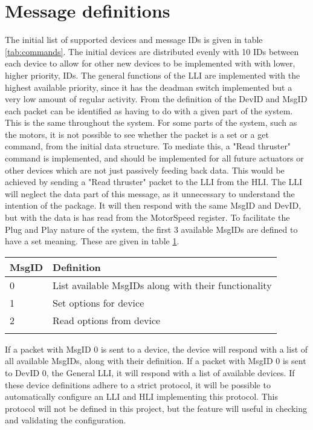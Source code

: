 \section{Message definitions}
The initial list of supported devices and message IDs is given in table \ref{tab:commands}. The initial devices are distributed evenly with 10 IDs between each device to allow for other new devices to be implemented with with lower, higher priority, IDs. The general functions of the LLI are implemented with the highest available priority, since it has the deadman switch implemented but a very low amount of regular activity.
From the definition of the DevID and MsgID each packet can be identified as having to do with a given part of the system. This is the same throughout the system. For some parts of the system, such as the motors, it is not possible to see whether the packet is a set or a get command, from the initial data structure. To mediate this, a "Read thruster" command is implemented, and should be implemented for all future actuators or other devices which are not just passively feeding back data. This would be achieved by sending a "Read thruster" packet to the LLI from the HLI. The LLI will neglect the data part of this message, as it unnecessary to understand the intention of the package. It will then respond with the same MsgID and  DevID, but with the data is has read from the MotorSpeed register.
To facilitate the Plug and Play nature of the system, the first 3 available MsgIDs are defined to have a set meaning. These are given in table \ref{firstmsgids}.
\begin{table}[h]
\centering
\begin{tabular}{ll}
\toprule
\textbf{MsgID} & \textbf{Definition}\\
\midrule
0 & List available MsgIDs along with their functionality\\
1 & Set options for device\\
2 & Read options from device\\
\bottomrule
\label{firstmsgids}
\end{tabular}
\end{table}
If a packet with MsgID 0 is sent to a device, the device will respond with a list of all available MsgIDs, along with their definition. If a packet with MsgID 0 is sent to DevID 0, the General LLI, it will respond with a list of available devices. If these device definitions adhere to a strict protocol, it will be possible to automatically configure an LLI and HLI implementing this protocol. This protocol will not be defined in this project, but the feature will useful in checking and validating the configuration.

